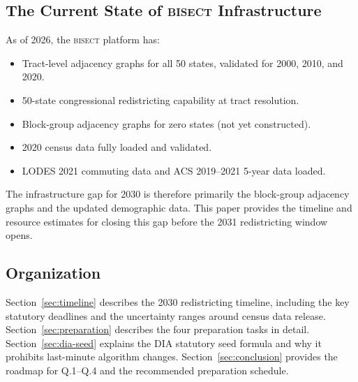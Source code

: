 \subsection{The Current State of \textsc{bisect} Infrastructure}

As of 2026, the \textsc{bisect} platform has:
\begin{itemize}
\item Tract-level adjacency graphs for all 50 states, validated for 2000, 2010, and 2020.
\item 50-state congressional redistricting capability at tract resolution.
\item Block-group adjacency graphs for zero states (not yet constructed).
\item 2020 census data fully loaded and validated.
\item LODES 2021 commuting data and ACS 2019--2021 5-year data loaded.
\end{itemize}

The infrastructure gap for 2030 is therefore primarily the block-group adjacency graphs
and the updated demographic data. This paper provides the timeline and resource estimates
for closing this gap before the 2031 redistricting window opens.

\subsection{Organization}

Section~\ref{sec:timeline} describes the 2030 redistricting timeline, including the
key statutory deadlines and the uncertainty ranges around census data release.
Section~\ref{sec:preparation} describes the four preparation tasks in detail.
Section~\ref{sec:dia-seed} explains the DIA statutory seed formula and why it
prohibits last-minute algorithm changes. Section~\ref{sec:conclusion} provides
the roadmap for Q.1--Q.4 and the recommended preparation schedule.
